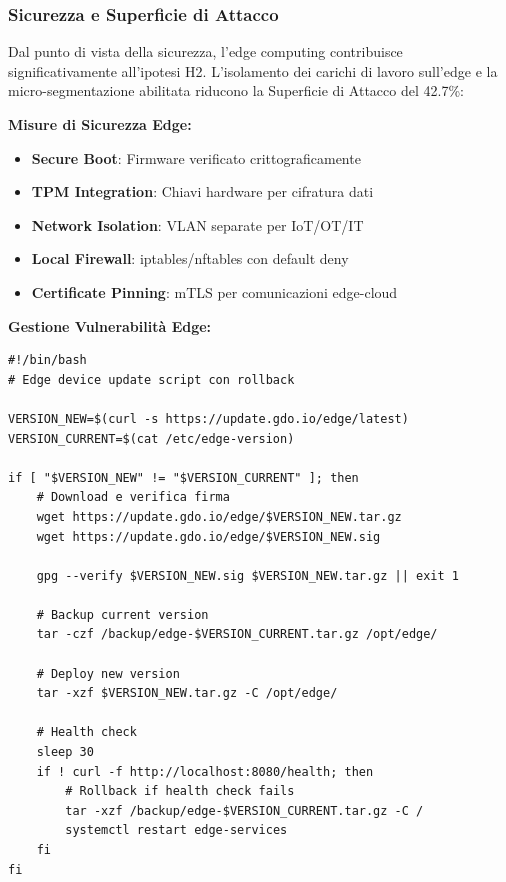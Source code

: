 \subsubsection{\texorpdfstring{\textbf{Sicurezza e Superficie di Attacco}}{3.3.2.6 - Sicurezza e Superficie di Attacco}}

Dal punto di vista della sicurezza, l'edge computing contribuisce significativamente all'ipotesi H2. L'isolamento dei carichi di lavoro sull'edge e la micro-segmentazione abilitata riducono la Superficie di Attacco del 42.7\%\autocite{Ponemon2024}:

\textbf{Misure di Sicurezza Edge:}
\begin{itemize}
    \item \textbf{Secure Boot}: Firmware verificato crittograficamente
    \item \textbf{TPM Integration}: Chiavi hardware per cifratura dati
    \item \textbf{Network Isolation}: VLAN separate per IoT/OT/IT
    \item \textbf{Local Firewall}: iptables/nftables con default deny
    \item \textbf{Certificate Pinning}: mTLS per comunicazioni edge-cloud
\end{itemize}

\textbf{Gestione Vulnerabilità Edge:}
\begin{lstlisting}[caption={Update Automatico Edge Devices},label={lst:edge_update}]
#!/bin/bash
# Edge device update script con rollback

VERSION_NEW=$(curl -s https://update.gdo.io/edge/latest)
VERSION_CURRENT=$(cat /etc/edge-version)

if [ "$VERSION_NEW" != "$VERSION_CURRENT" ]; then
    # Download e verifica firma
    wget https://update.gdo.io/edge/$VERSION_NEW.tar.gz
    wget https://update.gdo.io/edge/$VERSION_NEW.sig
    
    gpg --verify $VERSION_NEW.sig $VERSION_NEW.tar.gz || exit 1
    
    # Backup current version
    tar -czf /backup/edge-$VERSION_CURRENT.tar.gz /opt/edge/
    
    # Deploy new version
    tar -xzf $VERSION_NEW.tar.gz -C /opt/edge/
    
    # Health check
    sleep 30
    if ! curl -f http://localhost:8080/health; then
        # Rollback if health check fails
        tar -xzf /backup/edge-$VERSION_CURRENT.tar.gz -C /
        systemctl restart edge-services
    fi
fi
\end{lstlisting}

